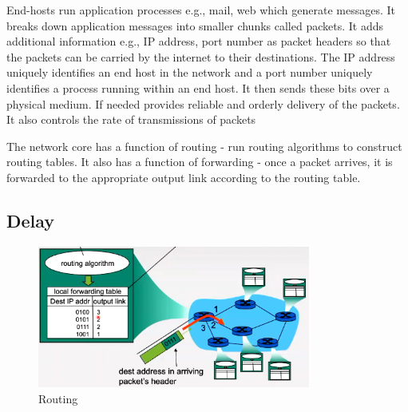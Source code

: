 \documentclass[a4paper]{article}
\theoremstyle{plain}
\theoremstyle{definition}
\newtheorem{defn}{Definition}[section]
\theoremstyle{remark}
\begin{document}
\begin{tcolorbox}[colback=black!3!white,colframe=black!60!white,title=\begin{defn}End-host \label{End-host}\end{defn}]
End-hosts run application processes e.g., mail, web which generate messages. It breaks down application messages into smaller chunks called packets. It adds additional information e.g., IP address, port number as packet headers so that the packets can be carried by the internet to their destinations. The IP address uniquely identifies an end host in the network and a port number uniquely identifies a process running within an end host. It then sends these bits over a physical medium. If needed provides reliable and orderly delivery of the packets. It also controls the rate of transmissions of packets
\end{tcolorbox}
\begin{tcolorbox}[colback=black!3!white,colframe=black!60!white,title=\begin{defn}Network Core \label{Network Core}\end{defn}]
The network core has a function of routing - run routing algorithms to construct routing tables. It also has a function of forwarding - once a packet arrives, it is forwarded to the appropriate output link according to the routing table.
\subsection{Delay}
\begin{figure}[H]
	\centering
	\includegraphics[width=0.8\textwidth]{seventeen.png}
	\caption{Routing}
	\label{fig:seventeen-png}
\end{figure}
\end{tcolorbox}
\end{document}
